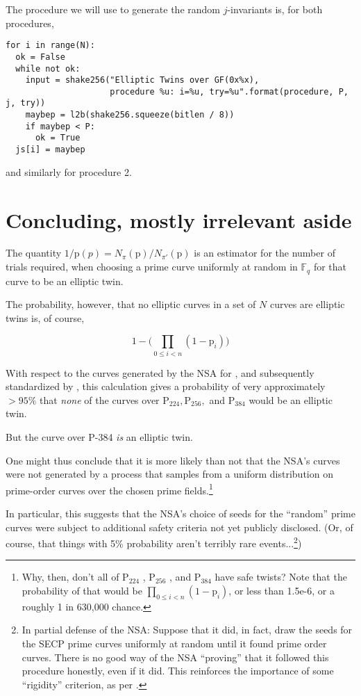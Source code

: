 \documentclass[11pt,fleqn]{article}
\newcommand{\mathup}{\mathrm}
\newcommand{\BbbF}{\mathbb{F}}
\newcommand{\p}{\ensuremath{\mathup{p}} }
\newcommand{\Pa}{\ensuremath{\mathup{P}_{224}} }
\newcommand{\Pb}{\ensuremath{\mathup{P}_{256}} }
\newcommand{\Pc}{\ensuremath{\mathup{P}_{384}} }
\begin{document}
The procedure we will use to generate the random $j$-invariants is, for both procedures,

{\tiny
\begin{verbatim}
for i in range(N):
  ok = False
  while not ok:
    input = shake256("Elliptic Twins over GF(0x%x),
                     procedure %u: i=%u, try=%u".format(procedure, P, j, try))
    maybep = l2b(shake256.squeeze(bitlen / 8))
    if maybep < P:
      ok = True
  js[i] = maybep
\end{verbatim}
}

and similarly for procedure 2.



\section{Concluding, mostly irrelevant aside}

The quantity $1 / \p(p) = N_{\pi}(\p) / N_{\pi'}(\p)$ is an estimator for
the number of trials required, when choosing a prime curve uniformly at
random in $\BbbF_q$ for that curve to be an elliptic twin.

The probability, however, that no elliptic curves in a set of $N$ curves
are elliptic twins is, of course,

\begin{equation}
1 - \lparen \prod_{0 \leq i < n} (1 - \p_i) \rparen
\end{equation}

With respect to the curves generated by the NSA for \autocite{SECP1}, and
subsequently standardized by \autocite{recur}, this calculation gives a
probability of very approximately $> 95\%$ that \emph{none} of the curves
over $\Pa, \Pb,$ and $\Pc$ would be an elliptic twin.

But the curve over P-384 \emph{is} an elliptic twin.

One might thus conclude that it is more likely than not that the NSA's 
curves were not generated by a process that samples from a uniform
distribution on prime-order curves over the chosen prime fields.\footnote{
Why, then, don't all of \Pa, \Pb, and \Pc have safe twists? Note that the
probability of that would be $\prod_{0 \leq i < n} (1 - \p_i)$, or less than
1.5e-6, or a roughly 1 in 630,000 chance.}

In particular, this suggests that the NSA's choice of seeds for the
``random'' prime curves were subject to additional safety criteria
not yet publicly disclosed. (Or, of course, that things with 5\%
probability aren't terribly rare events...\footnote{In partial defense of
the NSA: Suppose that it did, in fact, draw the seeds for the SECP prime
curves uniformly at random until it found prime order curves. There is no
good way of the NSA ``proving'' that it followed this procedure honestly,
even if it did. This reinforces the importance of some ``rigidity''
criterion, as per \autocite{NUMS}.})
\end{document}

